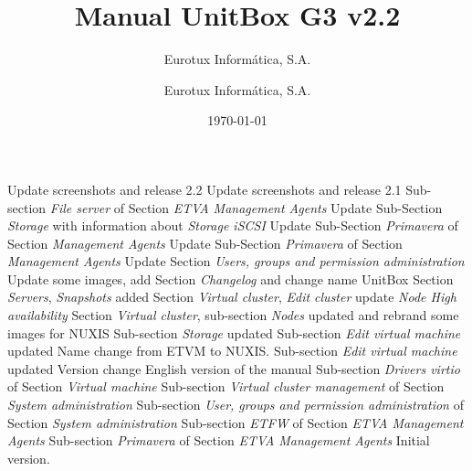 \documentclass[12pt,a4paper,english]{scrreprt}
\author{Eurotux Informática, S.A.}
\title{Manual UnitBox G3 v2.2}
\subtitle{Eurotux Informática, S.A.}
\date{\today}
\begin{document}
\maketitle

\begin{Log}
Update screenshots and release 2.2
Update screenshots and release 2.1
Sub-section \textit{File server} of Section \textit{ETVA Management Agents}
Update Sub-Section \textit{Storage} with information about \emph{Storage iSCSI}
Update Sub-Section \textit{Primavera} of Section \textit{Management Agents}
Update Sub-Section \textit{Primavera} of Section \textit{Management Agents}
Update Section \textit{Users, groups and permission administration}
Update some images, add Section \textit{Changelog} and change name UnitBox
Section \textit{Servers}, \textit{Snapshots} added
Section \textit{Virtual cluster}, \textit{Edit cluster} update \textit{Node High availability}
Section \textit{Virtual cluster}, sub-section \textit{Nodes} updated and rebrand some images for NUXIS
Sub-section \textit{Storage} updated 
Sub-section \textit{Edit virtual machine} updated 
Name change from ETVM to NUXIS. Sub-section \textit{Edit virtual machine} updated 
Version change
English version of the manual
Sub-section \textit{Drivers virtio} of Section \textit{Virtual machine}
Sub-section \textit{Virtual cluster management} of Section \textit{System administration}
Sub-section \textit{User, groups and permission administration} of Section \textit{System administration}
Sub-section \textit{ETFW} of Section \textit{ETVA Management Agents}
Sub-section \textit{Primavera} of Section \textit{ETVA Management Agents}
Initial version.
\end{Log}

\tableofcontents

\listoffigures


%
%




\end{document}
